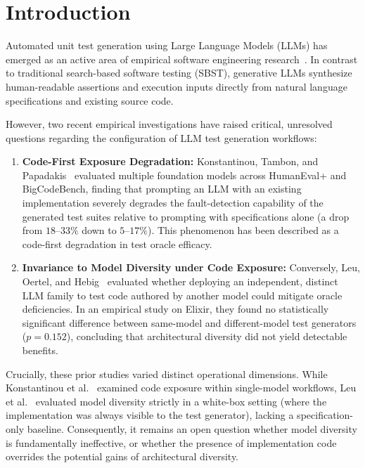 \documentclass[11pt,a4paper]{article}
\begin{document}
\section{Introduction}
\label{sec:intro}

Automated unit test generation using Large Language Models (LLMs) has emerged as an active area of empirical software engineering research~\cite{chen2021humaneval, lemieux2023codamosa, schafer2024testpilot}. In contrast to traditional search-based software testing (SBST), generative LLMs synthesize human-readable assertions and execution inputs directly from natural language specifications and existing source code.

However, two recent empirical investigations have raised critical, unresolved questions regarding the configuration of LLM test generation workflows:
\begin{enumerate}
    \item \textbf{Code-First Exposure Degradation:} Konstantinou, Tambon, and Papadakis~\cite{konstantinou2026codefirst} evaluated multiple foundation models across HumanEval+ and BigCodeBench, finding that prompting an LLM with an existing implementation severely degrades the fault-detection capability of the generated test suites relative to prompting with specifications alone (a drop from $18$--$33\%$ down to $5$--$17\%$). This phenomenon has been described as a code-first degradation in test oracle efficacy.
    \item \textbf{Invariance to Model Diversity under Code Exposure:} Conversely, Leu, Oertel, and Hebig~\cite{leu2026modeldiversity} evaluated whether deploying an independent, distinct LLM family to test code authored by another model could mitigate oracle deficiencies. In an empirical study on Elixir, they found no statistically significant difference between same-model and different-model test generators ($p = 0.152$), concluding that architectural diversity did not yield detectable benefits.
\end{enumerate}

Crucially, these prior studies varied distinct operational dimensions. While Konstantinou et al.~\cite{konstantinou2026codefirst} examined code exposure within single-model workflows, Leu et al.~\cite{leu2026modeldiversity} evaluated model diversity strictly in a white-box setting (where the implementation was always visible to the test generator), lacking a specification-only baseline. Consequently, it remains an open question whether model diversity is fundamentally ineffective, or whether the presence of implementation code overrides the potential gains of architectural diversity.
\end{document}
